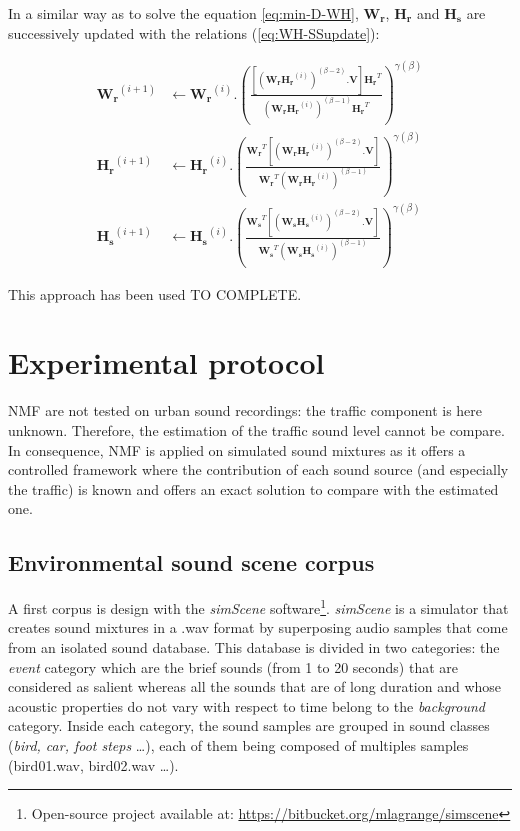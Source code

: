 \documentclass[twocolumn,a4paper,10pt]{article}
\begin{document}
In a similar way as to solve the equation \ref{eq:min-D-WH}, $\mathbf{W_r}$, $\mathbf{H_r}$ and $\mathbf{H_s}$ are successively updated with the relations (\ref{eq:WH-SSupdate}): 

{\scriptsize
\begin{subequations}\label{eq:WH-SSupdate}
\begin{align}
\mathbf{W_r}^{(i+1)} &\leftarrow \mathbf{W_r}^{(i)}.\left(\frac{\left[\left(\mathbf{W_r H_r}^{(i)} \right)^{(\beta-2)}.\mathbf{V} \right]\mathbf{H_r}^T}{\left(\mathbf{W_r H_r}^{(i)} \right)^{(\beta-1)}\mathbf{H_r}^T}\right)^{\gamma(\beta)}\label{eq:W_r_SS}\\
\mathbf{H_r}^{(i+1)} &\leftarrow \mathbf{H_r}^{(i)}.\left(\frac{\mathbf{W_r}^T \left[\left(\mathbf{W_r H_r}^{(i)} \right)^{(\beta-2)}.\mathbf{V} \right]}{\mathbf{W_r}^T \left(\mathbf{W_r H_r}^{(i)} \right)^{(\beta-1)}}\right)^{\gamma(\beta)}\label{eq:H_r_SS}\\
\mathbf{H_s}^{(i+1)} &\leftarrow \mathbf{H_s}^{(i)}.\left(\frac{\mathbf{W_s}^T \left[\left(\mathbf{W_s H_s}^{(i)} \right)^{(\beta-2)}.\mathbf{V} \right]}{\mathbf{W_s}^T \left(\mathbf{W_s H_s}^{(i)} \right)^{(\beta-1)}}\right)^{\gamma(\beta)}\label{eq:H_s_SS}
\end{align}
\end{subequations}}

This approach has been used TO COMPLETE.

\section{Experimental protocol}\label{part:protocol}

NMF are not tested on urban sound recordings: the traffic component is here unknown. Therefore, the estimation of the traffic sound level cannot be compare. In consequence, NMF is applied on simulated sound mixtures as it offers a controlled framework where the contribution of each sound source (and especially the traffic) is known and offers an exact solution to compare with the estimated one.

\subsection{Environmental sound scene corpus}

A first corpus is design with the \textit{simScene} software\footnote{Open-source project available at: \url{https://bitbucket.org/mlagrange/simscene}}. \textit{simScene} \cite{rossignol_simscene:_2015} is a simulator that creates sound mixtures in a .wav format by superposing audio samples that come from an isolated sound database. This database is divided in two categories: the \textit{event} category  which are the brief sounds (from 1 to 20 seconds) that are considered as salient whereas all the sounds that are of long duration and whose acoustic properties do not vary with respect to time belong to the \textit{background} category. Inside each category, the sound samples are grouped in sound classes (\textit{bird, car, foot steps} \dots), each of them being composed of multiples samples (bird01.wav, bird02.wav \dots).
\end{document}
